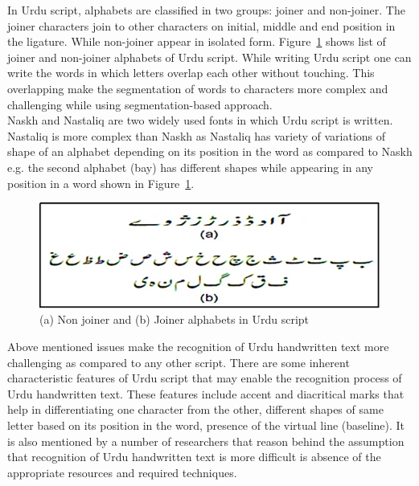In Urdu script, alphabets are classified in two groups: joiner and non-joiner. The joiner characters join to other characters on initial, middle and end position in the ligature. While non-joiner appear in isolated form. Figure~\ref{fig2} shows list of joiner and non-joiner alphabets of Urdu script. While writing Urdu script one can write the words in which letters overlap each other without touching. This overlapping make the segmentation of words to characters more complex and challenging while using segmentation-based approach.\\
Naskh and Nastaliq are two widely used fonts in which Urdu script is written. Nastaliq is more complex than Naskh as Nastaliq \cite{4} has variety of variations of shape of an alphabet depending on its position in the word as compared to Naskh e.g. the second alphabet (bay) has different shapes while appearing in any position in a word shown in Figure~\ref{fig2}.\\ 
\begin{figure}[t]
\centering
	\includegraphics[width=8.cm]{joiner.png}
\caption{(a) Non joiner and (b) Joiner alphabets in Urdu script}\label{fig2}
\end{figure}
Above mentioned issues make the recognition of Urdu handwritten text more challenging as compared to any other script. There are some inherent characteristic features of Urdu script that may enable the recognition process of Urdu handwritten text. These features include accent and diacritical marks that help in differentiating  one character from the other, different shapes of same letter based on its position in the word, presence of the virtual line (baseline). 
It is also mentioned by a number of researchers that reason behind the assumption that recognition of Urdu handwritten text is more difficult is absence of the appropriate resources and required techniques.\\
